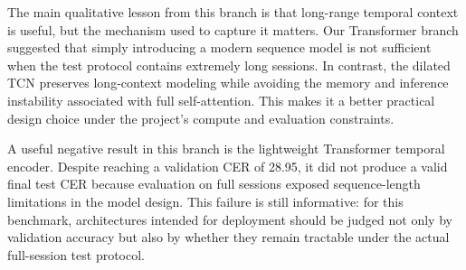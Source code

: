 The main qualitative lesson from this branch is that long-range temporal context is useful, but the mechanism used to capture it matters. Our Transformer branch suggested that simply introducing a modern sequence model is not sufficient when the test protocol contains extremely long sessions. In contrast, the dilated TCN preserves long-context modeling while avoiding the memory and inference instability associated with full self-attention. This makes it a better practical design choice under the project's compute and evaluation constraints.

A useful negative result in this branch is the lightweight Transformer temporal encoder. Despite reaching a validation CER of 28.95, it did not produce a valid final test CER because evaluation on full sessions exposed sequence-length limitations in the model design. This failure is still informative: for this benchmark, architectures intended for deployment should be judged not only by validation accuracy but also by whether they remain tractable under the actual full-session test protocol.

